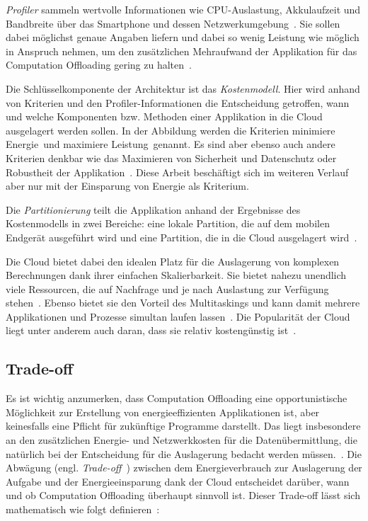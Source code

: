 \documentclass{sigchi}
\begin{document}
\emph{Profiler} sammeln wertvolle Informationen wie CPU-Auslastung, Akkulaufzeit und Bandbreite über das Smartphone und dessen Netzwerkumgebung~\cite{O13}.
Sie sollen dabei möglichst genaue Angaben liefern und dabei so wenig Leistung wie möglich in Anspruch nehmen, um den zusätzlichen Mehraufwand der Applikation für das Computation Offloading gering zu halten~\cite{thinkair}.

Die Schlüsselkomponente der Architektur ist das \emph{Kostenmodell}.
Hier wird anhand von Kriterien und den Profiler-Informationen die Entscheidung getroffen, wann und welche Komponenten bzw. Methoden einer Applikation in die Cloud ausgelagert werden sollen.
In der Abbildung werden die Kriterien \glqq minimiere Energie\grqq\ und \glqq maximiere Leistung\grqq\ genannt.
Es sind aber ebenso auch andere Kriterien denkbar wie das Maximieren von Sicherheit und Datenschutz oder Robustheit der Applikation~\cite{O13}.
Diese Arbeit beschäftigt sich im weiteren Verlauf aber nur mit der Einsparung von Energie als Kriterium.

Die \emph{Partitionierung} teilt die Applikation anhand der Ergebnisse des Kostenmodells in zwei Bereiche: eine lokale Partition, die auf dem mobilen Endgerät ausgeführt wird und eine Partition, die in die Cloud ausgelagert wird~\cite{O13}.

Die Cloud bietet dabei den idealen Platz für die Auslagerung von komplexen Berechnungen dank ihrer einfachen Skalierbarkeit.
Sie bietet nahezu unendlich viele Ressourcen, die auf Nachfrage und je nach Auslastung zur Verfügung stehen~\cite{o12}.
Ebenso bietet sie den Vorteil des Multitaskings und kann damit mehrere Applikationen und Prozesse simultan laufen lassen~\cite{o4}.
Die Popularität der Cloud liegt unter anderem auch daran, dass sie relativ kostengünstig ist~\cite{O13}.

\subsection{Trade-off}

Es ist wichtig anzumerken, dass Computation Offloading eine opportunistische Möglichkeit zur Erstellung von energieeffizienten Applikationen ist, aber keinesfalls eine Pflicht für zukünftige Programme darstellt.
Das liegt insbesondere an den zusätzlichen Energie- und Netzwerkkosten für die Datenübermittlung, die natürlich bei der Entscheidung für die Auslagerung bedacht werden müssen.~\cite{O13, o2}.
Die Abwägung (engl. \emph{Trade-off}~\cite{o8}) zwischen dem Energieverbrauch zur Auslagerung der Aufgabe und der Energieeinsparung dank der Cloud entscheidet darüber, wann und ob Computation Offloading überhaupt sinnvoll ist.
Dieser Trade-off lässt sich mathematisch wie folgt definieren~\cite{o8}: 
\end{document}
